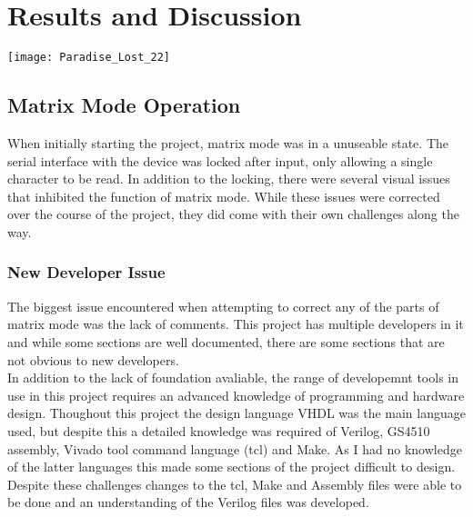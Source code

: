 
\chapter{Results and Discussion} %

\texttt{[image: Paradise\_Lost\_22]}

\label{Chapter 7} %


\section{Matrix Mode Operation}

\label{Ch7 Sec1}

When initially starting the project, matrix mode was in a unuseable state. The serial interface with the device was locked after input, only allowing a single character to be read. In addition to the locking, there were several visual issues that inhibited the function of matrix mode. While these issues were corrected over the course of the project, they did come with their own challenges along the way. 

\subsection{New Developer Issue}

\label{Ch7 Sec1 Sub1}

The biggest issue encountered when attempting to correct any of the parts of matrix mode was the lack of comments. This project has multiple developers in it and while some sections are well documented, there are some sections that are not obvious to new developers.\\
In addition to the lack of foundation avaliable, the range of developemnt tools in use in this project requires an advanced knowledge of programming and hardware design. Thoughout this project the design language VHDL was the main language used, but despite this a detailed knowledge was required of Verilog, GS4510 assembly, Vivado tool command language (tcl) and Make. As I had no knowledge of the latter languages this made some sections of the project difficult to design.\\
Despite these challenges changes to the tcl, Make and Assembly files were able to be done and an understanding of the Verilog files was developed.

